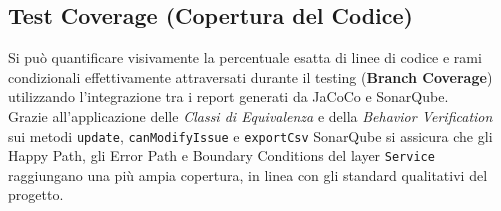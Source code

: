 \subsection{Test Coverage (Copertura del Codice)}
Si può quantificare visivamente la percentuale esatta di linee di codice e rami condizionali effettivamente attraversati durante il testing (\textbf{Branch Coverage}) utilizzando l'integrazione tra i report generati da JaCoCo e SonarQube.\\
Grazie all'applicazione delle \textit{Classi di Equivalenza} e della \textit{Behavior Verification} sui metodi \texttt{update}, \texttt{canModifyIssue} e \texttt{exportCsv} SonarQube si assicura che gli Happy Path, gli Error Path e Boundary Conditions del layer \texttt{Service} raggiungano una più ampia copertura, in linea con gli standard qualitativi del progetto. 